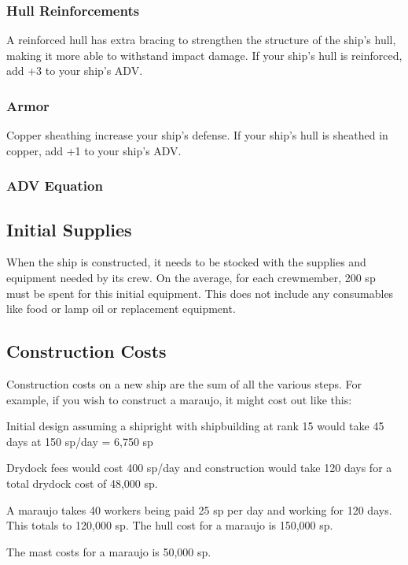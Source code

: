 \subsubsection{Hull Reinforcements}

A reinforced hull has extra bracing to strengthen the structure of the ship's hull, making it more able to withstand impact damage. If your ship's hull is reinforced, add +3 to your ship's ADV.
\subsubsection{Armor}

Copper sheathing increase your ship's defense. If your ship's hull is sheathed in copper, add +1 to your ship's ADV.
\subsubsection{ADV Equation}

\leavevmode\hphantom{\vphantom{.}}
\begin{normboxc}
\label{armor defense value!equation}

\end{normboxc}
\subsection{Initial Supplies}
When the ship is constructed, it needs to be stocked with the supplies and equipment needed by its crew. On the average, for each crewmember, 200 sp must be spent for this initial equipment. This does not include any consumables like food or lamp oil or replacement equipment.
\subsection{Construction Costs}
Construction costs on a new ship are the sum of all
the various steps. For example, if you wish to construct a
maraujo, it might cost out like this:

Initial design assuming a shipright with shipbuilding at rank 15 would take 45 days at 150 sp/day = 6,750 sp

Drydock fees would cost 400 sp/day and construction would take 120 days for a total drydock cost of 48,000 sp.

A maraujo takes 40 workers being paid 25 sp per day and working for 120 days. This totals to 120,000 sp. The hull cost for a maraujo is 150,000 sp.

The mast costs for a maraujo is 50,000 sp.

